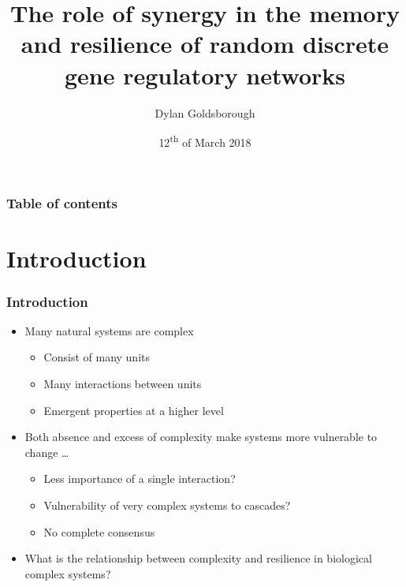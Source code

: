 \documentclass[hyperref={pdfpagelabels=false}]{beamer}
\title{The role of synergy in the memory and resilience of random discrete gene regulatory networks}
\author{Dylan Goldsborough}
\date{12\textsuperscript{th} of March 2018}
\begin{document}
\begin{frame}
\titlepage
\end{frame} 

\begin{frame}
\frametitle{Table of contents}
\tableofcontents
\end{frame} 


\section{Introduction} 
\setcounter{subsection}{1}

%
\begin{frame}
\frametitle{Introduction}
\begin{itemize}
\item Many natural systems are complex
\begin{itemize}
\item Consist of many units
\item Many interactions between units
\item Emergent properties at a higher level
\end{itemize}
\item Both absence and excess of complexity make systems more vulnerable to change \cite{kondoh2003foraging, macarthur1955fluctuations} \dots{}
\begin{itemize}
\item Less importance of a single interaction?
\item Vulnerability of very complex systems to cascades?
\item No complete consensus
\end{itemize}
\item What is the relationship between complexity and resilience in biological complex systems? 
\end{itemize}
\end{frame}
\end{document}

